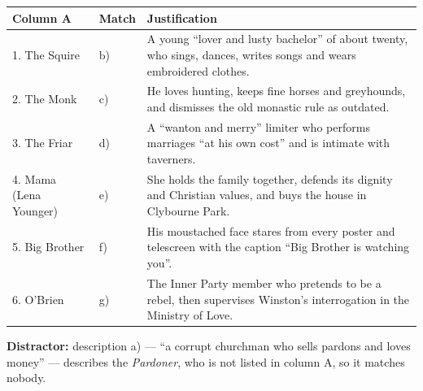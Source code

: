 \documentclass[11pt]{article}
\begin{document}
\begin{corrige}
\begin{center}
\begin{tabularx}{\linewidth}{|l|X|X|}
\hline
\rowcolor{popblueL} \textbf{Column A} & \textbf{Match} & \textbf{Justification} \\
\hline
1. The Squire & b) & A young ``lover and lusty bachelor'' of about twenty, who sings, dances, writes songs and wears embroidered clothes. \\
\hline
2. The Monk & c) & He loves hunting, keeps fine horses and greyhounds, and dismisses the old monastic rule as outdated. \\
\hline
3. The Friar & d) & A ``wanton and merry'' limiter who performs marriages ``at his own cost'' and is intimate with taverners. \\
\hline
4. Mama (Lena Younger) & e) & She holds the family together, defends its dignity and Christian values, and buys the house in Clybourne Park. \\
\hline
5. Big Brother & f) & His moustached face stares from every poster and telescreen with the caption ``Big Brother is watching you''. \\
\hline
6. O'Brien & g) & The Inner Party member who pretends to be a rebel, then supervises Winston's interrogation in the Ministry of Love. \\
\hline
\end{tabularx}
\end{center}
\textbf{Distractor:} description a) — ``a corrupt churchman who sells pardons and loves money'' — describes the \emph{Pardoner}, who is not listed in column A, so it matches nobody.
\end{corrige}
\end{document}
